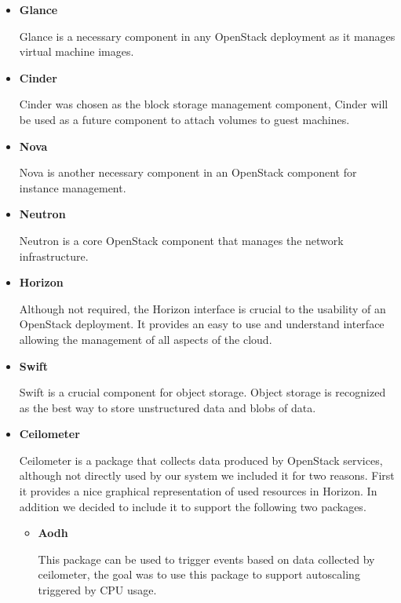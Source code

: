 \begin{enumerate}
\begin{itemize}
      \item \textbf{Glance}

        Glance is a necessary component in any OpenStack deployment as
        it manages virtual machine images.

      \item \textbf{Cinder}

        Cinder was chosen as the block storage management component,
        Cinder will be used as a future component to attach volumes to
        guest machines.

      \item \textbf{Nova}

        Nova is another necessary component in an OpenStack component
        for instance management. 

      \item \textbf{Neutron}

        Neutron is a core OpenStack component that manages the network
        infrastructure.

      \item \textbf{Horizon}

        Although not required, the Horizon interface is crucial to the 
        usability of an OpenStack deployment. It provides an easy to use
        and understand interface allowing the management of all aspects
        of the cloud.

      \item \textbf{Swift}

        Swift is a crucial component for object storage. Object storage is
        recognized as the best way to store unstructured data and blobs
        of data.

      \item \textbf{Ceilometer}

        Ceilometer is a package that collects data produced by OpenStack
        services, although not directly used by our system we included
        it for two reasons. First it provides a nice graphical
        representation of used resources in Horizon. In addition we 
        decided to include it to support the following two packages.
        
        \begin{itemize}
          \item \textbf{Aodh}
        
            This package can be used to trigger events based on data
            collected by ceilometer, the goal was to use this package
            to support autoscaling triggered by CPU usage.


\end{itemize}
\end{itemize}
\end{enumerate}
